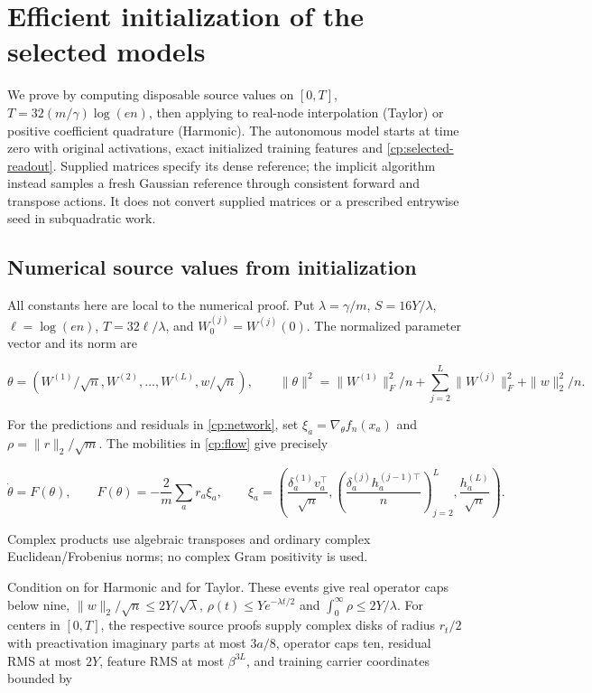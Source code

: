 \section{Efficient initialization of the selected models}
\label{cp:init:proof}

We prove  by computing disposable source values
on $[0,T]$, $T=32(m/\gamma)\log(en)$, then applying 
to real-node interpolation (Taylor) or positive coefficient quadrature
(Harmonic). The autonomous model starts at time zero with original
activations, exact initialized training features and
\eqref{cp:selected-readout}. Supplied matrices specify its dense reference;
the implicit algorithm instead samples a fresh Gaussian reference through
consistent forward and transpose actions. It does not convert supplied
matrices or a prescribed entrywise seed in subquadratic work.

\subsection{Numerical source values from initialization}
\label{cp:init:sec:numerics}

All constants here are local to the numerical proof. Put $\lambda=\gamma/m$, $S=16Y/\lambda$,
$\ell=\log(en)$, $T=32\ell/\lambda$, and $W_0^{(j)}=W^{(j)}(0)$.
The normalized parameter vector and its norm are

\[
\theta=(W^{(1)}/\sqrt n,W^{(2)},\ldots,W^{(L)},w/\sqrt n),
\qquad
\|\theta\|^2=\|W^{(1)}\|_F^2/n+
 \sum_{j=2}^L\|W^{(j)}\|_F^2+\|w\|_2^2/n.
\]

For the predictions and residuals in \eqref{cp:network}, set
$\xi_a=\nabla_\theta f_n(x_a)$ and
$\rho=\|r\|_2/\sqrt m$. The mobilities in
\eqref{cp:flow} give precisely

\begin{equation}
\label{cp:init:eq:field}
\dot\theta=F(\theta),\qquad
F(\theta)=-\frac2m\sum_a r_a\xi_a,\qquad
\xi_a=\left(\frac{\delta_a^{(1)}v_a^\top}{\sqrt n},
 \left(\frac{\delta_a^{(j)}h_a^{(j-1)\top}}n\right)_{j=2}^L,
 \frac{h_a^{(L)}}{\sqrt n}\right).
\end{equation}

Complex products use algebraic transposes and ordinary complex
Euclidean/Frobenius norms; no complex Gram positivity is used.

Condition on  for Harmonic and
 for Taylor. These events give real operator caps below nine,
$\|w\|_2/\sqrt n\le2Y/\sqrt\lambda$,
$\rho(t)\le Ye^{-\lambda t/2}$ and $\int_0^\infty\rho\le2Y/\lambda$.
For centers in $[0,T]$, the respective source proofs supply complex
disks of radius $r_t/2$ with preactivation imaginary parts at most
$3a/8$, operator caps ten, residual RMS at most $2Y$, feature RMS at most
$\beta^{3L}$, and training carrier coordinates bounded by

